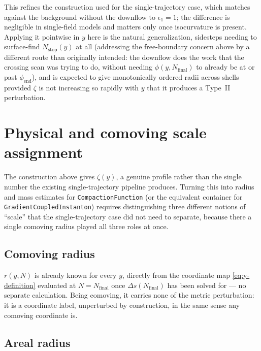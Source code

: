 \documentclass[a4paper,11pt]{article}
\newcommand{\Ny}{N}                          %
\newcommand{\Nfinal}{N_{\mathrm{final}}}     %
\newcommand{\epsSR}{\epsilon_1}              %
\newcommand{\field}{\phi}                    %
\newcommand{\phiend}{\field_{\mathrm{end}}}
\newcommand{\rad}{r}                         %
\newcommand{\yco}{y}                         %
\newcommand{\Deltas}{\Delta s}                %
\newcommand{\zprofile}{\zeta}                %
\begin{document}
This refines the construction used for the single-trajectory case, which
matches against the background without the downflow to $\epsSR=1$; the
difference is negligible in single-field models and matters only once
isocurvature is present.
Applying it pointwise in $\yco$ here is the natural generalization,
sidesteps needing to surface-find $\Ny_{\mathrm{stop}}(\yco)$ at all
(addressing the free-boundary concern above by a different route than
originally intended: the downflow does the work that the crossing scan
was trying to do, without needing $\field(\yco,\Nfinal)$ to already be at
or past $\phiend$), and is expected to give monotonically ordered radii
across shells provided $\zprofile$ is not increasing so rapidly with
$\yco$ that it produces a Type~II perturbation.


\section{Physical and comoving scale assignment}
\label{sec:scale-assignment}

The construction above gives $\zprofile(\yco)$, a genuine profile rather
than the single number the existing single-trajectory pipeline produces.
Turning this into radius and mass estimates for
\texttt{CompactionFunction} (or the equivalent
container for \texttt{GradientCoupledInstanton})
requires distinguishing three different
notions of ``scale'' that the single-trajectory case did not need to
separate, because there a single comoving radius played all three roles
at once.

\subsection{Comoving radius}

$\rad(\yco,\Ny)$ is already known for every $\yco$, directly from the
coordinate map \eqref{eq:y-definition} evaluated at $\Ny=\Nfinal$ once
$\Deltas(\Nfinal)$ has been solved for --- no separate calculation. Being
comoving, it carries none of the metric perturbation: it is a coordinate
label, unperturbed by construction, in the same sense any comoving
coordinate is.

\subsection{Areal radius}
\end{document}
